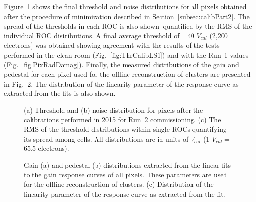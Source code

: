 Figure~\ref{fig:ThrCalib2015} shows the final threshold and noise distributions for all pixels obtained after the procedure of minimization described in Section~\ref{subsec:calibPart2}.
The spread of the thresholds in each ROC is also shown, quantified by the RMS of the individual ROC distributions.
A final average threshold of ~ 40 $V_{cal}$ (2,200 electrons) was obtained showing agreement with the results of the tests performed in the clean room (Fig.~\ref{fig:ThrCalibLS1})
and with the Run~1 values (Fig.~\ref{fig:PixRadDamag}).
Finally, the measured distributions of the gain and pedestal for each pixel used for the offline reconstruction of clusters are presented in Fig.~\ref{fig:GainCalib2015}.
The distribution of the linearity parameter of the response curve as extracted from the fits is also shown.

\begin{figure}[!htb]
 \begin{center}
 \end{center}
 \caption{(a) Threshold and (b) noise distribution for pixels after the calibrations performed in 2015 for Run~2 commissioning. (c) The RMS of the threshold distributions within single ROCs quantifying its spread among cells. All distributions are in units of $V_{cal}$ (1 $V_{cal}$ = 65.5 electrons).}
 \label{fig:ThrCalib2015}
\end{figure}

\begin{figure}[!htb]
 \begin{center}
 \end{center}
 \caption{Gain (a) and pedestal (b) distributions extracted from the linear fits to the gain response curves of all pixels. These parameters are used for the offline reconstruction of clusters. (c) Distribution of the linearity parameter of the response curve as extracted from the fit.}
 \label{fig:GainCalib2015}
\end{figure}


